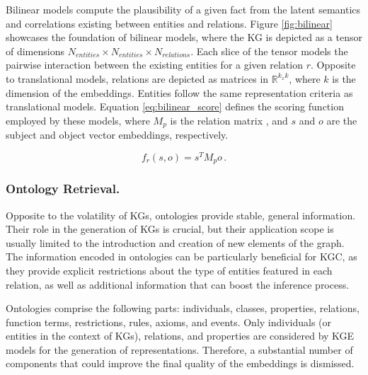 Bilinear models compute the plausibility of a given fact from the latent semantics and correlations existing between entities and relations. Figure \ref{fig:bilinear} showcases the foundation of bilinear models, where the KG is depicted as a tensor of dimensions $N_{entities} \times N_{entities} \times N_{relations}$. Each slice of the tensor models the pairwise interaction between the existing entities for a given relation $r$. Opposite to translational models, relations are depicted as matrices in $\mathbb{R}^{k_x k}$, where $k$ is the dimension of the embeddings. Entities follow the same representation criteria as translational models. Equation \ref{eq:bilinear_score} defines the scoring function employed by these models, where $M_p$ is the relation matrix , and $s$ and $o$ are the subject and object vector embeddings, respectively.

\begin{equation}\label{eq:bilinear_score}
    f_r(s,o)=s^T M_p o \,.
\end{equation}





\subsubsection{Ontology Retrieval.} \label{subsec:s4_onto_retrieval}
Opposite to the volatility of KGs, ontologies provide stable, general information. Their role in the generation of KGs is crucial, but their application scope is usually limited to the introduction and creation of new elements of the graph. The information encoded in ontologies can be particularly beneficial for KGC, as they provide explicit restrictions about the type of entities featured in each relation, as well as additional information that can boost the inference process.

Ontologies comprise the following parts: individuals, classes, properties, relations, function terms, restrictions, rules, axioms, and events. Only individuals (or entities in the context of KGs), relations, and properties are considered by KGE models for the generation of representations. Therefore, a substantial number of components that could improve the final quality of the embeddings is dismissed.

